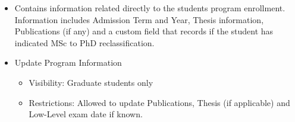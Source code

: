 \documentclass[11pt,a4paper]{report}
\begin{document}
\begin{itemize}

\item Contains information related directly to the students program enrollment. Information includes Admission Term and Year, Thesis information, Publications (if any) and a custom field that records if the student has indicated MSc to PhD reclassification.
\item Update Program Information
\begin{itemize}
\item Visibility: Graduate students only
\item Restrictions: Allowed to update Publications, Thesis (if applicable) and Low-Level exam date if known. 
\end {itemize} 
\end {itemize} 
\end{document}
